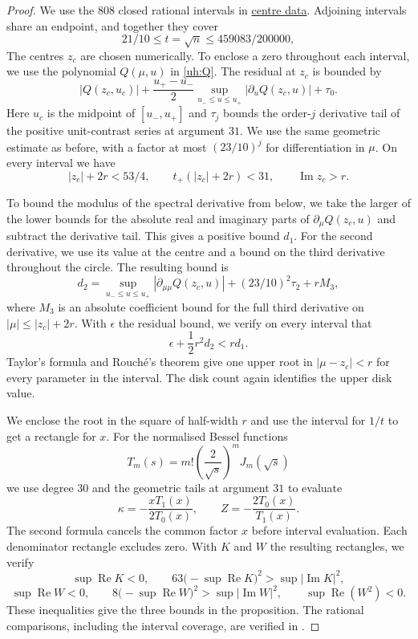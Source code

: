 \documentclass[a4paper,11pt]{amsart}
\newcommand{\repofile}[2]{\href{https://github.com/MColbrook/transmission-shape-optimisation/blob/main/#1}{#2}}
\numberwithin{equation}{section}
\theoremstyle{plain}
\theoremstyle{definition}
\begin{document}
\begin{proof}
We use the \(808\) closed rational intervals in
\repofile{subresonant/unit_midrange/cap/hessian_compact_centres.json}{centre data}.
Adjoining intervals share an endpoint, and together they cover
\[
 21/10\le t=\sqrt n\le459083/200000,
\]
The centres \(z_c\) are chosen numerically. To enclose a zero
throughout each interval, we use the polynomial \(Q(\mu,u)\) in
\eqref{uh:Q}. The residual at \(z_c\) is bounded by
\[
 |Q(z_c,u_c)|
 +\frac{u_+-u_-}{2}
       \sup_{u_-\le u\le u_+}|\partial_uQ(z_c,u)|+\tau_0.
\]
Here \(u_c\) is the midpoint of \([u_-,u_+]\) and \(\tau_j\)
bounds the order-\(j\) derivative tail of the positive unit-contrast
series at argument \(31\). We use the same geometric estimate as
before, with a factor at most \((23/10)^j\) for differentiation in
\(\mu\). On every interval we have
\[
 |z_c|+2r<53/4,\qquad
 t_+(|z_c|+2r)<31,\qquad \operatorname{Im}z_c>r.
\]

To bound the modulus of the spectral derivative from below, we
take the larger of the lower bounds for the absolute real and
imaginary parts of \(\partial_\mu Q(z_c,u)\) and subtract the
derivative tail. This gives a positive bound \(d_1\). For the
second derivative, we use its value at the centre and a bound on
the third derivative throughout the circle. The resulting bound is
\[
 d_2=\sup_{u_-\le u\le u_+}
          |\partial_{\mu\mu}Q(z_c,u)|
       +(23/10)^2\tau_2+rM_3,
\]
where \(M_3\) is an absolute coefficient bound for the full
third derivative on \(|\mu|\le|z_c|+2r\).
With \(\epsilon\) the residual bound, we verify on every interval that
\[
 \epsilon+\frac12r^2d_2<rd_1.
\]
Taylor's formula and Rouch\'e's theorem give one upper
root in \(|\mu-z_c|<r\) for every parameter in the interval.
The disk count again identifies the upper disk value.

We enclose the root in the square of half-width \(r\) and use
the interval for \(1/t\) to get a rectangle for \(x\).
For the normalised Bessel functions
\[
 T_m(s)=m!\left(\frac2{\sqrt s}\right)^mJ_m(\sqrt s)
\]
we use degree \(30\) and the geometric tails at argument \(31\)
to evaluate
\[
 \kappa=-\frac{xT_1(x)}{2T_0(x)},\qquad
 Z=-\frac{2T_0(x)}{T_1(x)}.
\]
The second formula cancels the common factor \(x\) before
interval evaluation. Each denominator rectangle excludes zero.
With \(K\) and \(W\) the resulting rectangles, we verify
\[
 \sup\operatorname{Re}K<0,\qquad
 63\bigl(-\sup\operatorname{Re}K\bigr)^2
       >\sup|\operatorname{Im}K|^2,
\]
\[
 \sup\operatorname{Re}W<0,\qquad
 8\bigl(-\sup\operatorname{Re}W\bigr)^2
       >\sup|\operatorname{Im}W|^2,
 \qquad \sup\operatorname{Re}(W^2)<0.
\]
These inequalities give the three bounds in the proposition.
The rational comparisons, including the interval coverage, are
verified in .
\end{proof}
\end{document}
